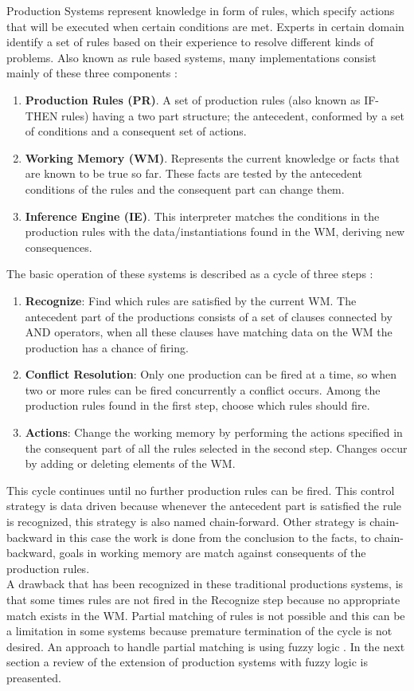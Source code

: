 Production Systems represent knowledge in form of rules, which specify
actions that will be executed when certain conditions are met. Experts
in certain domain identify a set of rules based on their experience to
resolve different kinds of problems. Also known as rule based systems,
many implementations consist mainly of these three
components \cite{brachman1992knowledge} \cite{konar2006computational}:
\begin{enumerate}   
\item \textbf{Production Rules (PR)}. A set of
production rules (also known as IF-THEN rules) having a two part
structure; the antecedent, conformed by a set of conditions and a
consequent set of actions. 
\item \textbf{Working Memory (WM)}.
Represents the current knowledge or facts that are known to be true so
far. These facts are tested by the antecedent conditions of the rules
and the consequent part can change them. 
\item \textbf{Inference Engine (IE)}. 
This interpreter matches the conditions in the
production rules with the data/instantiations found in the WM,
deriving new consequences.
\end{enumerate}
The basic operation of these systems is described as a cycle of 
three steps \cite{brachman1992knowledge}:
\begin{enumerate}
\item \textbf{Recognize}: Find which rules are satisfied by 
the current WM. The antecedent part of the productions consists 
of a set of clauses connected by AND operators, when all these 
clauses have matching data on the WM the production has a chance 
of firing.
\item \textbf{Conflict Resolution}: Only one production can be 
fired at a time, so when two or more rules can be fired concurrently 
a conflict occurs. Among the production rules found in the first 
step, choose which rules should fire.
\item \textbf{Actions}: Change the working memory by performing 
the actions specified in the consequent part of all the rules 
selected in the second step. Changes occur by adding or 
deleting elements of the WM.
\end{enumerate}
This cycle continues until no further production rules can be fired.
This control strategy is data driven because whenever the antecedent
part is satisfied the rule is recognized, this strategy is also named
chain-forward. Other strategy is chain-backward in this case the work
is done from the conclusion to the facts, to chain-backward, goals in
working memory are match against consequents of the production
rules.\\A drawback that has been recognized in these traditional
productions systems, is that some times rules are not fired in the
Recognize step because no appropriate match exists in the WM. Partial
matching of rules is not possible and this can be a limitation in some
systems because premature termination of the cycle is not desired. An
approach to handle partial matching is using fuzzy logic
\cite{konar2006computational}. In the next section a review of the
extension of production systems with fuzzy logic is preasented.\\

